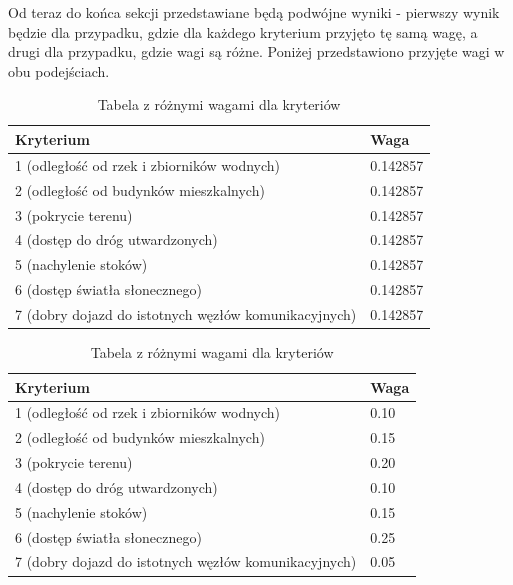 \documentclass{article}
\begin{document}
Od teraz do końca sekcji przedstawiane będą podwójne wyniki - pierwszy wynik będzie dla przypadku, gdzie dla każdego kryterium przyjęto tę samą wagę, a drugi dla przypadku, gdzie wagi są różne. Poniżej przedstawiono przyjęte wagi w obu podejściach.
\begin{table}[ht]
    \begin{minipage}{0.48\textwidth}
        \centering
        \renewcommand{\arraystretch}{1.2}
        \begin{tabular}{|p{4cm}|p{1.4cm}|}
        \hline
        \textbf{Kryterium} & \textbf{Waga}\\
        \hline
        1 (odległość od rzek i zbiorników wodnych) & 0.142857\\
        \hline
        2 (odległość od budynków mieszkalnych) & 0.142857\\
        \hline
        3 (pokrycie terenu) & 0.142857\\
        \hline
        4 (dostęp do dróg utwardzonych) & 0.142857\\
        \hline
        5 (nachylenie stoków) & 0.142857\\    
        \hline
        6 (dostęp światła słonecznego) & 0.142857\\
        \hline
        7 (dobry dojazd do istotnych węzłów komunikacyjnych) & 0.142857\\
        \hline
        \end{tabular}
        \caption{Tabela z równymi wagami dla kryteriów}
        \label{tab:bdot_costs_equal}
    \end{minipage}
    \hfill
    \begin{minipage}{0.48\textwidth}
        \centering
        \renewcommand{\arraystretch}{1.2}
        \begin{tabular}{|p{4cm}|p{1cm}|}
        \hline
        \textbf{Kryterium} & \textbf{Waga}\\
        \hline
        1 (odległość od rzek i zbiorników wodnych) & 0.10\\
        \hline
        2 (odległość od budynków mieszkalnych) & 0.15\\
        \hline
        3 (pokrycie terenu) & 0.20\\
        \hline
        4 (dostęp do dróg utwardzonych) & 0.10\\
        \hline
        5 (nachylenie stoków) & 0.15\\    
        \hline
        6 (dostęp światła słonecznego) & 0.25\\
        \hline
        7 (dobry dojazd do istotnych węzłów komunikacyjnych) & 0.05\\
        \hline
        \end{tabular}
        \caption{Tabela z różnymi wagami dla kryteriów}
        \label{tab:bdot_costs_different}
    \end{minipage}
\end{table}
\end{document}
